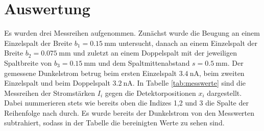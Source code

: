 \section{Auswertung}
\label{sec:Auswertung}

Es wurden drei Messreihen aufgenommen. Zunächst wurde die Beugung an einem Einzelspalt
der Breite $b_1 = \SI{0.15}{\milli\meter}$ untersucht, danach an einem Einzelspalt
der Breite $b_2 = \SI{0.075}{\milli\meter}$ und zuletzt an einem Doppelspalt mit
der jeweiligen Spaltbreite von $b_3 = \SI{0.15}{\milli\meter}$ und dem Spaltmittenabstand
$s = \SI{0.5}{\milli\meter}$. Der gemessene Dunkelstrom betrug beim ersten Einzelspalt
$\SI{3.4}{\nano\ampere}$, beim zweiten Einzelspalt und beim Doppelspalt
$\SI{3.2}{\nano\ampere}$. In Tabelle \ref{tab:messwerte} sind die Messreihen der Stromstärken
$I_i$ gegen die Detektorpositionen $x_i$ dargestellt. Dabei nummerieren stets wie bereits oben die Indizes 1,2 und 3 die
Spalte der Reihenfolge nach durch. Es wurde bereits der Dunkelstrom von den Messwerten
subtrahiert, sodass in der Tabelle die bereinigten Werte zu sehen sind.

